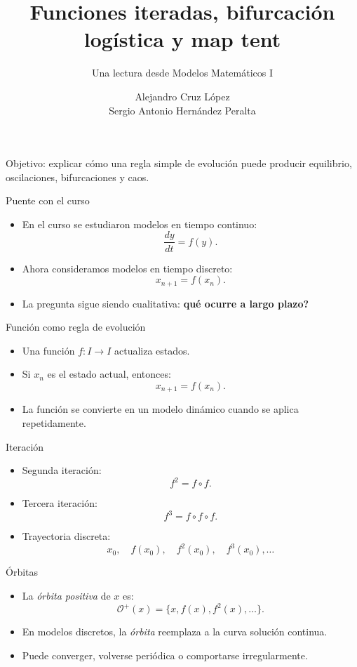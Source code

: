 \documentclass[aspectratio=169,11pt]{beamer}
\title[Funciones iteradas y bifurcaci\'on]{Funciones iteradas, bifurcaci\'on log\'istica y map tent}
\subtitle{Una lectura desde Modelos Matem\'aticos I}
\author{Alejandro Cruz L\'opez \\
        Sergio Antonio Hernández Peralta}
\date{}
\newcommand{\orb}{\mathcal O^+}
\begin{document}
\begin{frame}
    \titlepage
    \vspace{-0.4cm}
    \begin{center}
        \small Objetivo: explicar c\'omo una regla simple de evoluci\'on puede producir equilibrio, oscilaciones, bifurcaciones y caos.
    \end{center}
\end{frame}

\begin{frame}{Puente con el curso}
    \begin{itemize}
        \item En el curso se estudiaron modelos en tiempo continuo:
        \[
        \frac{dy}{dt}=f(y).
        \]
        \item Ahora consideramos modelos en tiempo discreto:
        \[
        x_{n+1}=f(x_n).
        \]
        \item La pregunta sigue siendo cualitativa: \textbf{\textquestiondown{}qu\'e ocurre a largo plazo?}
    \end{itemize}
\end{frame}

\begin{frame}{Funci\'on como regla de evoluci\'on}
    \begin{itemize}
        \item Una funci\'on $f:I\to I$ actualiza estados.
        \item Si $x_n$ es el estado actual, entonces:
        \[
        x_{n+1}=f(x_n).
        \]
        \item La funci\'on se convierte en un modelo din\'amico cuando se aplica repetidamente.
    \end{itemize}
\end{frame}

\begin{frame}{Iteraci\'on}
    \begin{itemize}
        \item Segunda iteraci\'on:
        \[
        f^2=f\circ f.
        \]
        \item Tercera iteraci\'on:
        \[
        f^3=f\circ f\circ f.
        \]
        \item Trayectoria discreta:
        \[
        x_0,\quad f(x_0),\quad f^2(x_0),\quad f^3(x_0),\ldots
        \]
    \end{itemize}
\end{frame}

\begin{frame}{\'Orbitas}
    \begin{itemize}
        \item La \textit{\'orbita positiva} de $x$ es:
        \[
        \orb(x)=\{x,f(x),f^2(x),\ldots\}.
        \]
        \item En modelos discretos, la \textit{\'orbita} reemplaza a la curva soluci\'on continua.
        \item Puede converger, volverse peri\'odica o comportarse irregularmente.
    \end{itemize}
\end{frame}
\end{document}

